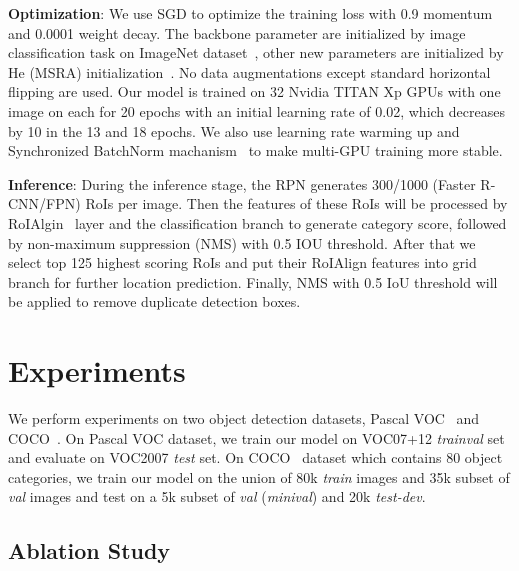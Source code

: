 \documentclass[10pt,twocolumn,letterpaper]{article}
\begin{document}
\textbf{Optimization}: We use SGD to optimize the training loss with 0.9 momentum and 0.0001 weight decay. The backbone parameter are initialized by image classification task on ImageNet dataset~\cite{russakovsky2015imagenet}, other new parameters are initialized by He (MSRA) initialization~\cite{HeZR015}. No data augmentations except standard horizontal flipping are used.
Our model is trained on 32 Nvidia TITAN Xp GPUs with one image on each for 20 epochs with an initial learning rate of 0.02, which decreases by 10 in the 13 and 18 epochs. We also use learning rate warming up and Synchronized BatchNorm machanism~\cite{goyal2017accurate,peng2017megdet} to make multi-GPU training more stable.

\textbf{Inference}: During the inference stage, the RPN generates 300/1000 (Faster R-CNN/FPN) RoIs per image. Then the features of these RoIs will be processed by RoIAlgin~\cite{he2017mask} layer and the classification branch to generate category score, followed by non-maximum suppression (NMS) with 0.5 IOU threshold. After that we select top 125 highest scoring RoIs and put their RoIAlign features into grid branch for further location prediction. Finally, NMS with 0.5 IoU threshold will be applied to remove duplicate detection boxes.



\section{Experiments}
We perform experiments on two object detection datasets, Pascal VOC~\cite{everingham2015pascal} and COCO~\cite{lin2014microsoft}. On Pascal VOC dataset, we train our model on VOC07+12 \textit{trainval} set and evaluate on VOC2007 \textit{test} set. On COCO~\cite{lin2014microsoft} dataset which contains 80 object categories, we train our model on the union of 80k \textit{train} images and 35k subset of \textit{val} images and test on a 5k subset of \textit{val} (\textit{minival}) and 20k \textit{test-dev}.





\subsection{Ablation Study}
\end{document}
